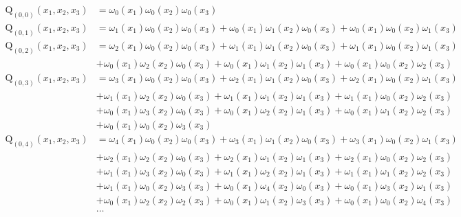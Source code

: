 \begin{equation*} \begin{aligned}
\mathrm{Q}_{(0,0)}(x_1, x_2, x_3) &=  
  \omega_0(x_1) \omega_0(x_2) \omega_0(x_3) \\
%
\mathrm{Q}_{(0,1)}(x_1, x_2, x_3) &=  
  \omega_1(x_1) \omega_0(x_2) \omega_0(x_3)
+ \omega_0(x_1) \omega_1(x_2) \omega_0(x_3)
+ \omega_0(x_1) \omega_0(x_2) \omega_1(x_3) \\
%
\mathrm{Q}_{(0,2)}(x_1, x_2, x_3) &=  
  \omega_2(x_1) \omega_0(x_2) \omega_0(x_3)
+ \omega_1(x_1) \omega_1(x_2) \omega_0(x_3)
+ \omega_1(x_1) \omega_0(x_2) \omega_1(x_3) \\ &
+ \omega_0(x_1) \omega_2(x_2) \omega_0(x_3)
+ \omega_0(x_1) \omega_1(x_2) \omega_1(x_3)
+ \omega_0(x_1) \omega_0(x_2) \omega_2(x_3) \\
%
\mathrm{Q}_{(0,3)}(x_1, x_2, x_3) &=   
  \omega_3(x_1) \omega_0(x_2) \omega_0(x_3)
+ \omega_2(x_1) \omega_1(x_2) \omega_0(x_3)
+ \omega_2(x_1) \omega_0(x_2) \omega_1(x_3) \\ &
+ \omega_1(x_1) \omega_2(x_2) \omega_0(x_3)
+ \omega_1(x_1) \omega_1(x_2) \omega_1(x_3)
+ \omega_1(x_1) \omega_0(x_2) \omega_2(x_3) \\ &
+ \omega_0(x_1) \omega_3(x_2) \omega_0(x_3)
+ \omega_0(x_1) \omega_2(x_2) \omega_1(x_3)
+ \omega_0(x_1) \omega_1(x_2) \omega_2(x_3) \\ &
+ \omega_0(x_1) \omega_0(x_2) \omega_3(x_3) \\
%
\mathrm{Q}_{(0,4)}(x_1, x_2, x_3) &=  
  \omega_4(x_1) \omega_0(x_2) \omega_0(x_3)
+ \omega_3(x_1) \omega_1(x_2) \omega_0(x_3)
+ \omega_3(x_1) \omega_0(x_2) \omega_1(x_3) \\ &
+ \omega_2(x_1) \omega_2(x_2) \omega_0(x_3)
+ \omega_2(x_1) \omega_1(x_2) \omega_1(x_3)
+ \omega_2(x_1) \omega_0(x_2) \omega_2(x_3) \\ &
+ \omega_1(x_1) \omega_3(x_2) \omega_0(x_3)
+ \omega_1(x_1) \omega_2(x_2) \omega_1(x_3)
+ \omega_1(x_1) \omega_1(x_2) \omega_2(x_3) \\ &
+ \omega_1(x_1) \omega_0(x_2) \omega_3(x_3)
+ \omega_0(x_1) \omega_4(x_2) \omega_0(x_3)
+ \omega_0(x_1) \omega_3(x_2) \omega_1(x_3) \\ &
+ \omega_0(x_1) \omega_2(x_2) \omega_2(x_3)
+ \omega_0(x_1) \omega_1(x_2) \omega_3(x_3)
+ \omega_0(x_1) \omega_0(x_2) \omega_4(x_3) \\
%
&\ldots \\
\end{aligned} \end{equation*}

